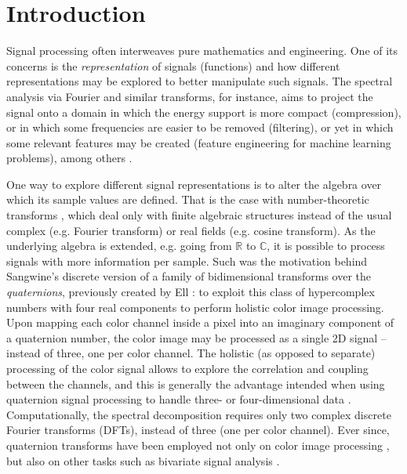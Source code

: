 \chapter{Introduction}
\label{ch:Intro}

Signal processing often interweaves pure mathematics and engineering. One of its concerns is the \textit{representation} of signals (functions) and how different representations may be explored to better manipulate such signals. The spectral analysis via Fourier and similar transforms, for instance, aims to project the signal onto a domain in which the energy support is more compact (compression), or in which some frequencies are easier to be removed (filtering), or yet in which some relevant features may be created (feature engineering for machine learning problems), among others \cite{oppenheim1999discrete, rabiner2010theory, graf2015features, vergin1999generalized}.

One way to explore different signal representations is to alter the algebra over which its sample values are defined. That is the case with number-theoretic transforms \cite{lima2011finite,blahut2010fast,pedrouzo2017number,chandra2014exact}, which deal only with finite algebraic structures instead of the usual complex (e.g. Fourier transform) or real fields (e.g. cosine transform). As the underlying algebra is extended, e.g. going from $ \mathbb{R} $ to $ \mathbb{C} $, it is possible to process signals with more information per sample. Such was the motivation behind Sangwine's \cite{sangwine1996fourier} discrete version of a family of bidimensional transforms over the \textit{quaternions}, previously created by Ell \cite{ell1993quaternion}: to exploit this class of hypercomplex numbers with four real components to perform holistic color image processing. Upon mapping each color channel inside a pixel into an imaginary component of a quaternion number, the color image may be processed as a single 2D signal -- instead of three, one per color channel. The holistic (as opposed to separate) processing of the color signal allows to explore the correlation and coupling between the channels, and this is generally the advantage intended when using quaternion signal processing to handle three- or four-dimensional data \cite{took2008quaternion}. Computationally, the spectral decomposition requires only two complex discrete Fourier transforms (DFTs), instead of three (one per color channel). Ever since, quaternion transforms have been employed not only on color image processing \cite{ell2007hypercomplex,chen2018quaternion,li2013quaternion,evans2000hypercomplex}, but also on other tasks such as bivariate signal analysis \cite{flamant2017spectral,flamant2017time,flamant2018complete}.


